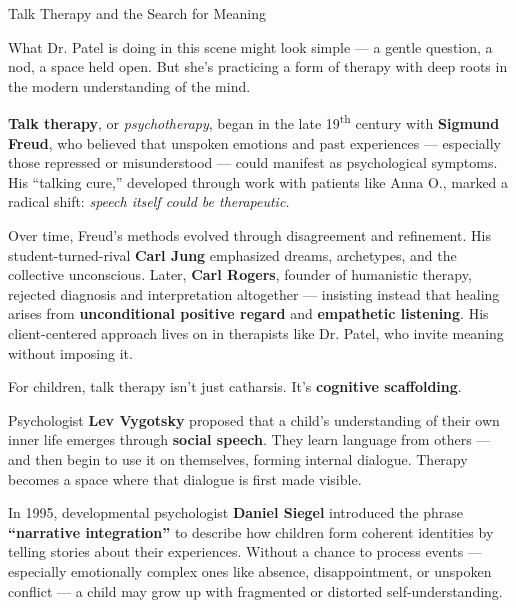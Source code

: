 \begin{PsychologicalSidebar}{Talk Therapy and the Search for Meaning}

    What Dr. Patel is doing in this scene might look simple — a gentle question, a nod, a space held open.  
    But she’s practicing a form of therapy with deep roots in the modern understanding of the mind.
    
    \medskip
    
    \textbf{Talk therapy}, or \textit{psychotherapy}, began in the late 19\textsuperscript{th} century 
    with \textbf{Sigmund Freud}, who believed that unspoken emotions and past experiences — especially 
    those repressed or misunderstood — could manifest as psychological symptoms. His ``talking cure,'' 
    developed through work with patients like Anna O., marked a radical shift:  
    \textit{speech itself could be therapeutic.}
    
    \medskip
    
    Over time, Freud’s methods evolved through disagreement and refinement. His student-turned-rival 
    \textbf{Carl Jung} emphasized dreams, archetypes, and the collective unconscious. Later, \textbf{Carl 
    Rogers}, founder of humanistic therapy, rejected diagnosis and interpretation altogether — insisting 
    instead that healing arises from \textbf{unconditional positive regard} and \textbf{empathetic 
    listening}. His client-centered approach lives on in therapists like Dr. Patel, who invite meaning 
    without imposing it.
    
    \medskip
    
    For children, talk therapy isn’t just catharsis. It’s \textbf{cognitive scaffolding}.
    
    Psychologist \textbf{Lev Vygotsky} proposed that a child’s understanding of their own inner life 
    emerges through \textbf{social speech}. They learn language from others — and then begin to use it 
    on themselves, forming internal dialogue. Therapy becomes a space where that dialogue is first 
    made visible.
    
    \medskip
    
    In 1995, developmental psychologist \textbf{Daniel Siegel} introduced the phrase \textbf{“narrative 
    integration”} to describe how children form coherent identities by telling stories about their 
    experiences. Without a chance to process events — especially emotionally complex ones like absence, 
    disappointment, or unspoken conflict — a child may grow up with fragmented or distorted 
    self-understanding.
    

\end{PsychologicalSidebar}
